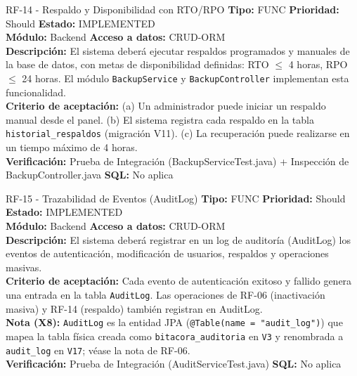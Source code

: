 \documentclass[11pt,a4paper]{article}
\begin{document}
\begin{requisito}{RF-14 - Respaldo y Disponibilidad con RTO/RPO}
    \textbf{Tipo:} FUNC \quad \textbf{Prioridad:} Should \quad \textbf{Estado:} IMPLEMENTED \\[0.2cm]
    \textbf{Módulo:} Backend \quad \textbf{Acceso a datos:} CRUD-ORM \\[0.2cm]
    \textbf{Descripción:} El sistema deberá ejecutar respaldos programados y manuales de la base de datos, con metas de disponibilidad definidas: RTO $\leq$ 4 horas, RPO $\leq$ 24 horas. El módulo \texttt{BackupService} y \texttt{BackupController} implementan esta funcionalidad. \\[0.2cm]
    \textbf{Criterio de aceptación:} (a) Un administrador puede iniciar un respaldo manual desde el panel. (b) El sistema registra cada respaldo en la tabla \texttt{historial\_respaldos} (migración V11). (c) La recuperación puede realizarse en un tiempo máximo de 4 horas. \\[0.2cm]
    \textbf{Verificación:} Prueba de Integración (BackupServiceTest.java) + Inspección de BackupController.java \quad \textbf{SQL:} No aplica
\end{requisito}

\begin{requisito}{RF-15 - Trazabilidad de Eventos (AuditLog)}
    \textbf{Tipo:} FUNC \quad \textbf{Prioridad:} Should \quad \textbf{Estado:} IMPLEMENTED \\[0.2cm]
    \textbf{Módulo:} Backend \quad \textbf{Acceso a datos:} CRUD-ORM \\[0.2cm]
    \textbf{Descripción:} El sistema deberá registrar en un log de auditoría (AuditLog) los eventos de autenticación, modificación de usuarios, respaldos y operaciones masivas. \\[0.2cm]
    \textbf{Criterio de aceptación:} Cada evento de autenticación exitoso y fallido genera una entrada en la tabla \texttt{AuditLog}. Las operaciones de RF-06 (inactivación masiva) y RF-14 (respaldo) también registran en AuditLog. \\[0.2cm]
    \textbf{Nota (X8):} \texttt{AuditLog} es la entidad JPA (\texttt{@Table(name = "audit\_log")}) que mapea la tabla física creada como \texttt{bitacora\_auditoria} en \texttt{V3} y renombrada a \texttt{audit\_log} en \texttt{V17}; véase la nota de RF-06. \\[0.2cm]
    \textbf{Verificación:} Prueba de Integración (AuditServiceTest.java) \quad \textbf{SQL:} No aplica
\end{requisito}
\end{document}

